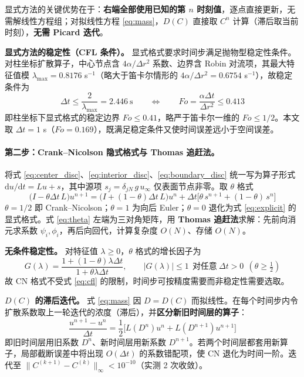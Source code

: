 \documentclass[12pt,a4paper]{ctexart}
\newcommand{\dd}{\mathrm{d}}
\begin{document}
显式方法的关键优势在于：\textbf{右端全部使用已知的第 $n$ 时刻值}，逐点直接更新，无需解线性方程组；对拟线性方程 \eqref{eq:mass}，$D(C)$ 直接取 $C^n$ 计算（滞后取当前时刻），\textbf{无需 Picard 迭代}。

\textbf{显式方法的稳定性（CFL 条件）。} 显式格式要求时间步满足抛物型稳定性条件。对柱坐标扩散算子，中心节点含 $4\alpha/\Delta r^2$ 系数、边界含 Robin 对流项，其最大特征值模 $\lambda_{\max}=0.8176$ s$^{-1}$（略大于笛卡尔情形的 $4\alpha/\Delta r^2=0.6754$ s$^{-1}$），故稳定条件为
\begin{equation}
\Delta t\le\frac{2}{\lambda_{\max}}=2.446\ \text{s}
\qquad\Longleftrightarrow\qquad
Fo=\frac{\alpha\Delta t}{\Delta r^2}\le 0.413
\label{eq:cfl}
\end{equation}
即柱坐标下显式格式的稳定边界 $Fo\le0.41$，略严于笛卡尔一维的 $Fo\le1/2$。本文取 $\Delta t=1$ s（$Fo=0.169$），既满足稳定条件又使时间误差远小于空间误差。

\paragraph{第二步：Crank--Nicolson 隐式格式与 Thomas 追赶法。}
将式 \eqref{eq:center_disc}、\eqref{eq:interior_disc}、\eqref{eq:boundary_disc} 统一写为算子形式 $\dd u/\dd t=Lu+s$，其中源项 $s_j=\delta_{jN}\,g\,u_\infty$ 仅表面节点非零。取 $\theta$ 格式
\begin{equation}
\big(I-\theta\Delta t\,L\big)u^{n+1}=\big(I+(1-\theta)\Delta t\,L\big)u^{n}
+\Delta t\big[\theta\,s^{n+1}+(1-\theta)\,s^{n}\big]
\label{eq:theta}
\end{equation}
$\theta=1/2$ 即 Crank--Nicolson；$\theta=1$ 为向后 Euler；$\theta=0$ 退化为式 \eqref{eq:explicit} 的显式格式。式 \eqref{eq:theta} 左端为三对角矩阵，用 \textbf{Thomas 追赶法}求解：先前向消元求系数 $\psi_i,\phi_i$，再后向回代，计算复杂度 $O(N)$、存储 $O(N)$。

\textbf{无条件稳定性。} 对特征值 $\lambda\ge0$，$\theta$ 格式的增长因子为
\begin{equation}
G(\lambda)=\frac{1+(1-\theta)\lambda\Delta t}{1+\theta\lambda\Delta t},
\qquad
|G(\lambda)|\le1\ \ \text{对任意}\ \Delta t>0\ \ (\theta\ge\tfrac12)
\label{eq:growth}
\end{equation}
故 CN 格式不受式 \eqref{eq:cfl} 的限制，时间步可按精度需要而非稳定性需要选取。

\textbf{$D(C)$ 的滞后迭代。} 式 \eqref{eq:mass} 因 $D=D(C)$ 而拟线性。在每个时间步内令扩散系数取上一轮迭代的浓度（滞后），并\textbf{区分新旧时间层的算子}：
\begin{equation}
\frac{u^{n+1}-u^{n}}{\Delta t}
=\frac12\Big[L(D^n)u^{n}+L(D^{n+1})u^{n+1}\Big]
\label{eq:cn_varc}
\end{equation}
即旧时间层用旧系数 $D^n$、新时间层用新系数 $D^{n+1}$。若两个时间层都套用新算子，局部截断误差中将出现 $O(\Delta t)$ 的系数错配项，使 CN 退化为时间一阶。迭代至 $\|C^{(k+1)}-C^{(k)}\|_\infty<10^{-10}$（实测 2 次收敛）。
\end{document}
